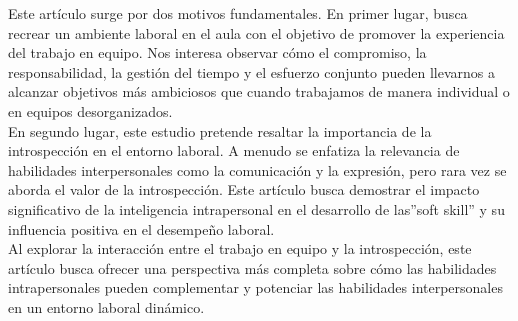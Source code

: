 Este artículo surge por dos motivos fundamentales. En primer lugar, busca
recrear un ambiente laboral en el aula con el objetivo de promover la
experiencia del trabajo en equipo. Nos interesa observar cómo el compromiso, la
responsabilidad, la gestión del tiempo y el esfuerzo conjunto pueden llevarnos a
alcanzar objetivos más ambiciosos que cuando trabajamos de manera individual o
en equipos desorganizados.\\
En segundo lugar, este estudio pretende resaltar la importancia de la
introspección en el entorno laboral. A menudo se enfatiza la relevancia de
habilidades interpersonales como la comunicación y la expresión, pero rara vez
se aborda el valor de la introspección. Este artículo busca demostrar el impacto
significativo de la inteligencia intrapersonal en el desarrollo de las''soft
skill'' y su influencia positiva en el desempeño laboral.\\
Al explorar la interacción entre el trabajo en equipo y la introspección, este
artículo busca ofrecer una perspectiva más completa sobre cómo las habilidades
intrapersonales pueden complementar y potenciar las habilidades interpersonales
en un entorno laboral dinámico.\\
